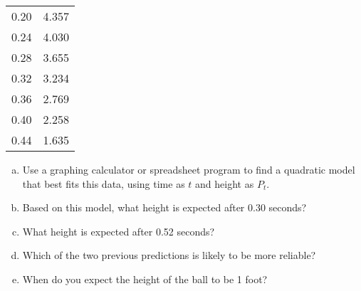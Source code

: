 \begin{exercises}
{\begin{center}
\begin{tabular}{c c}
0.20 & 4.357\\
0.24 & 4.030\\
0.28 & 3.655\\
0.32 & 3.234\\
0.36 & 2.769\\
0.40 & 2.258\\
0.44 & 1.635
\end{tabular}
\end{center}
\begin{enumerate}[(a)]
\item Use a graphing calculator or spreadsheet program to find a quadratic model that best fits this data, using time as $t$ and height as $P_t$.
\item Based on this model, what height is expected after 0.30 seconds?
\item What height is expected after 0.52 seconds?
\item Which of the two previous predictions is likely to be more reliable?
\item When do you expect the height of the ball to be 1 foot?
\end{enumerate}}


\end{exercises}
